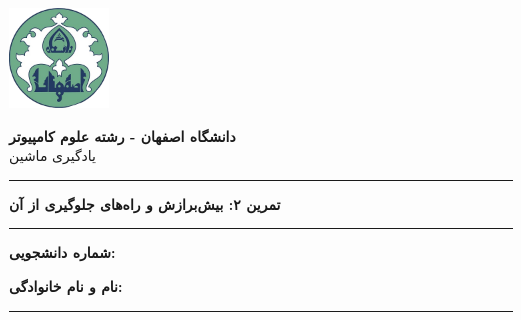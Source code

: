 \begin{center}
	\includegraphics[width=75pt, height=75pt]{./images/isf_uni_logo.png}
\end{center}

\begin{center}
	\begin{minipage}{\textwidth}
		\begin{center}
			\textbf{\Large دانشگاه اصفهان - رشته علوم کامپیوتر \\}
			\Large {یادگیری ماشین}
		\end{center}
		\hrule
		\begin{center}
			\textbf{\huge {تمرین ۲: بیش‌برازش و راه‌های جلوگیری از آن}}
		\end{center}
		\hrule
	\end{minipage}
\end{center}

\begin{flushright}
	\textbf{\large شماره دانشجویی:}
\end{flushright}
\begin{flushright}
	\textbf{\large نام و نام خانوادگی:}
\end{flushright}
\hrule
\vspace{\baselineskip}
\vspace{\baselineskip}